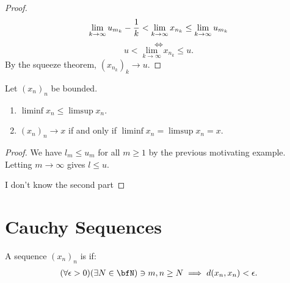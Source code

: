 \begin{proof}
                \begin{equation*}
                    \lim_{k \rightarrow \infty} u_{m_k} - \frac{1}{k} < \lim_{k \rightarrow \infty} x_{n_k} \leq \lim_{k \rightarrow \infty}u_{m_k}
                    \vspace{3pt}
                \end{equation*}
                \begin{equation*}
                    \iff
                \end{equation*}
                \begin{equation*}
                    u < \lim_{k \rightarrow \infty} x_{n_k} \leq u.
                \end{equation*}
            By the squeeze theorem, $(x_{n_k})_k \rightarrow u$.
        \end{proof}

    \begin{proposition}
        Let $(x_n)_n$ be bounded.
            \begin{enumerate}[label = (\arabic*)]
                \item $\liminf x_n \leq \limsup x_n$.
                \item $(x_n)_n \rightarrow x$\hspace{2pt} if and only if \hspace{2pt}$\liminf x_n = \limsup x_n = x$.
            \end{enumerate}
    \end{proposition}
        \begin{proof}
            We have $l_m \leq u_m$ for all $m \geq 1$ by the previous motivating example. Letting $m \rightarrow \infty$ gives $l \leq u$.

            {\color{red} I don't know the second part}
        \end{proof}

\section{Cauchy Sequences}
    \begin{definition}
        A sequence $(x_n)_n$ is  if:
            \begin{equation*}
            \begin{split}
                (\forall \epsilon > 0)(\exists N \in \bfN) \ni m,n \geq N \implies d(x_n,x_n) < \epsilon.
            \end{split}
            \end{equation*}
    \end{definition}

